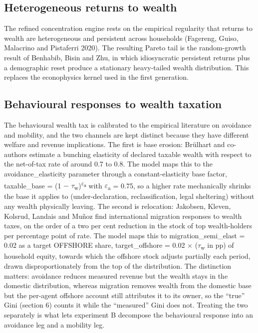 \documentclass[12pt]{article}
\begin{document}
\hypertarget{heterogeneous-returns-to-wealth}{%
\subsection{Heterogeneous returns to
wealth}\label{heterogeneous-returns-to-wealth}}

The refined concentration engine rests on the empirical regularity that
returns to wealth are heterogeneous and persistent across households
(Fagereng, Guiso, Malacrino and Pistaferri 2020). The resulting Pareto
tail is the random-growth result of Benhabib, Bisin and Zhu, in which
idiosyncratic persistent returns plus a demographic reset produce a
stationary heavy-tailed wealth distribution. This replaces the
econophysics kernel used in the first generation.

\hypertarget{behavioural-responses-to-wealth-taxation}{%
\subsection{Behavioural responses to wealth
taxation}\label{behavioural-responses-to-wealth-taxation}}

The behavioural wealth tax is calibrated to the empirical literature on
avoidance and mobility, and the two channels are kept distinct because
they have different welfare and revenue implications. The first is base
erosion: Brülhart and co-authors estimate a bunching elasticity of
declared taxable wealth with respect to the net-of-tax rate of around
0.7 to 0.8. The model maps this to the avoidance\_elasticity parameter
through a constant-elasticity base factor, taxable\_base = (1 $-$
$\tau$\textsubscript{w})\textsuperscript{$\varepsilon$\textsubscript{a}} with
$\varepsilon$\textsubscript{a} = 0.75, so a higher rate mechanically shrinks the
base it applies to (under-declaration, reclassification, legal
sheltering) without any wealth physically leaving. The second is
relocation: Jakobsen, Kleven, Kolsrud, Landais and Muñoz find
international migration responses to wealth taxes, on the order of a two
per cent reduction in the stock of top wealth-holders per percentage
point of rate. The model maps this to migration\_semi\_elast = 0.02 as a
target OFFSHORE share, target\_offshore = 0.02 $\times$ ($\tau$\textsubscript{w} in
pp) of household equity, towards which the offshore stock adjusts
partially each period, drawn disproportionately from the top of the
distribution. The distinction matters: avoidance reduces measured
revenue but the wealth stays in the domestic distribution, whereas
migration removes wealth from the domestic base but the per-agent
offshore account still attributes it to its owner, so the ``true'' Gini
(section 6) counts it while the ``measured'' Gini does not. Treating the
two separately is what lets experiment B decompose the behavioural
response into an avoidance leg and a mobility leg.
\end{document}
